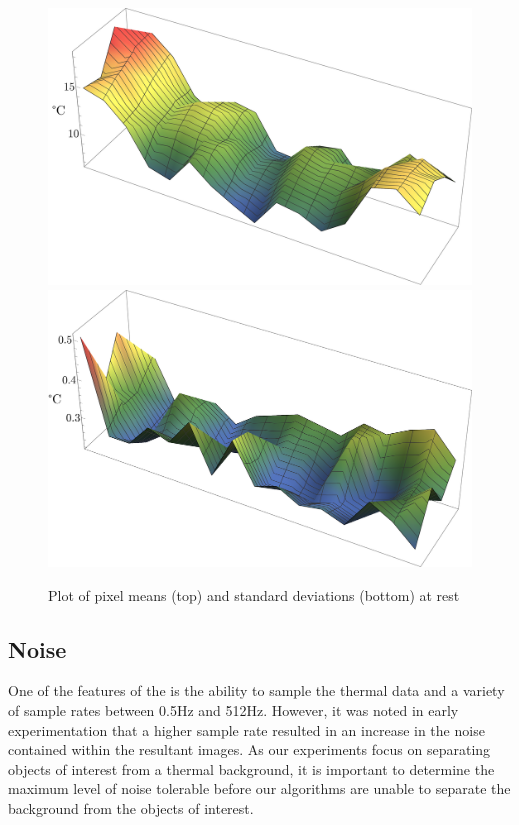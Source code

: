 \documentclass[../thesis/thesis.tex]{subfiles}
\begin{document}
\begin{figure}
\centering
\includegraphics[width=\textwidth]{../diagrams/rest-avg.png}
\includegraphics[width=\textwidth]{../diagrams/rest-stddev.png}
\caption{Plot of pixel means (top) and standard deviations (bottom) at rest}
\label{fig:meanstdplot}
\end{figure}


\subsection{Noise}

One of the features of the \mlx is the ability to sample the thermal data and a variety of sample rates between 0.5Hz and 512Hz. However, it was noted in early experimentation that a higher sample rate resulted in an increase in the noise contained within the resultant images. As our experiments focus on separating objects of interest from a thermal background, it is important to determine the maximum level of noise tolerable before our algorithms are unable to separate the background from the objects of interest.
\end{document}

